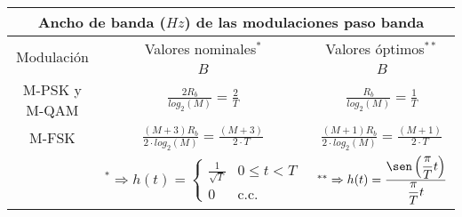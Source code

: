 \documentclass[12pt,es,blanco]{uah}
\begin{document}
\begin{center}
        \renewcommand{\arraystretch}{2}
        \begin{tabular}{|c|c|c|}
            \multicolumn{3}{c}{{\bf Ancho de banda ($Hz$) de las modulaciones paso banda }} \\
            \hline
            \multirow{2}{*}{Modulación} & Valores nominales$^*$ & Valores óptimos$^{**}$ \\
            \cline{2-3}
            & $B$ & $B$ \\
            \hline
            M-PSK y M-QAM & $\displaystyle\frac{2 R_b}{log_2(M)} = \displaystyle\frac{2}{T}$ & $\displaystyle\frac{R_b}{log_2(M)} = \displaystyle\frac{1}{T}$ \\[1ex]
            \hline
            M-FSK & $\displaystyle\frac{(M+3) R_b}{2 \cdot log_2(M)} = \displaystyle\frac{(M+3)}{2\cdot T}$ & $\displaystyle\frac{(M+1) R_b}{2 \cdot log_2(M)} = \displaystyle\frac{(M+1)}{2\cdot T}$ \\[1ex]
            \hline
            & $^* \Rightarrow h(t) = \left \{ \begin{array}{lc} \displaystyle\frac{1}{\sqrt{T}} & 0\leq t < T \\ 0 & \text{c.c.} \end{array}\right. $ & $^{**} \Rightarrow h(t) = \displaystyle\frac{\sen\left ( \displaystyle\frac{\pi}{T} t \right ) }{\displaystyle\frac{\pi}{T}t}$ \\
            \hline
        \end{tabular}
        \renewcommand{\arraystretch}{1}
        \vspace{0.5cm}
    

\end{center}
\end{document}
